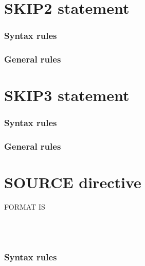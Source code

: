 \section{SKIP2 statement}

\begin{syntax}[\miscextcolour]
\end{syntax}

\subsubsection{Syntax rules}

\subsubsection{General rules}

\section{SKIP3 statement}

\begin{syntax}[\miscextcolour]
\end{syntax}

\subsubsection{Syntax rules}

\subsubsection{General rules}

\section{SOURCE directive}

\begin{syntax}
  \directiveindicator{} FORMAT IS
  \begin{1=}
     \\
     \\
  \end{1=}
\end{syntax}

\subsubsection{Syntax rules}

